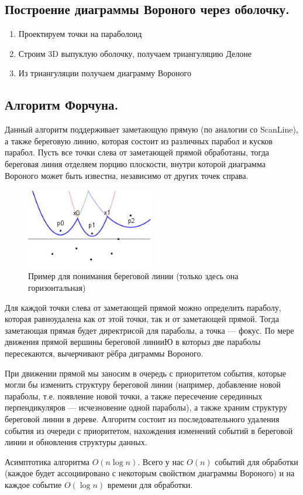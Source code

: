 \subsection{Построение диаграммы Вороного через оболочку.}
\begin{enumerate}
  \item Проектируем точки на параболоид
  \item Строим 3D выпуклую оболочку, получаем триангуляцию Делоне
  \item Из триангуляции получаем диаграмму Вороного
\end{enumerate}

\subsection{Алгоритм Форчуна.}

Данный алгоритм поддерживает заметающую прямую (по аналогии со ScanLine), а также береговую линию, которая
состоит из различных парабол и кусков парабол. Пусть все точки слева от заметающей прямой обработаны, 
тогда береговая линия отделяем порцию плоскости, внутри которой диаграмма Вороного может быть известна,
независимо от других точек справа.

\begin{figure}[H]    
  \centering    
  \includegraphics[width=0.5\textwidth]{figures/forchExample.png}    
  \caption*{Пример для понимания береговой линии (только здесь она горизонтальная)}        
\end{figure} 

Для каждой точки слева от заметающей прямой можно определить параболу, которая равноудалена как от этой
точки, так и от заметающей прямой. Тогда заметающая прямая будет директрисой для параболы, а точка --- 
фокус. По мере движения прямой вершины береговой линииЮ в которыз две параболы пересекаются, вычерчивают
рёбра диграммы Вороного. 

При движении прямой мы заносим в очередь с приоритетом события, которые могли бы изменить структуру
береговой линии (например, добавление новой параболы, т.е. появление новой точки, а также пересечение
серединных перпендикуляров --- исчезновение одной параболы), а также храним структуру береговой линни
в дереве. Алгоритм состоит из последовательного удаления события из очереди с приоритетом, нахождения
изменений событий в береговой линии и обновления структуры данных.

\begin{remark}
  Асимптотика алгоритма $O(n \log n)$. Всего у нас $O(n)$ событий для обработки (каждое будет ассоциировано
  с некоторым свойством диаграммы Вороного) и на каждое событие $O(\log n)$ времени для обработки.
\end{remark}


